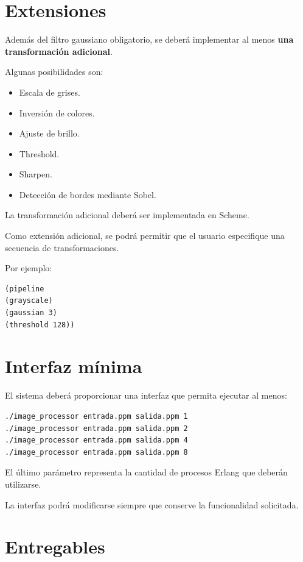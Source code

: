 \documentclass[11pt,a4paper]{article}
\begin{document}
\section{Extensiones}

Además del filtro gaussiano obligatorio, se deberá implementar al menos
\textbf{una transformación adicional}.

Algunas posibilidades son:

\begin{itemize}
\item Escala de grises.
\item Inversión de colores.
\item Ajuste de brillo.
\item Threshold.
\item Sharpen.
\item Detección de bordes mediante Sobel.
\end{itemize}

La transformación adicional deberá ser implementada en Scheme.

Como extensión adicional, se podrá permitir que el usuario especifique
una secuencia de transformaciones.

Por ejemplo:

\begin{lstlisting}
(pipeline
(grayscale)
(gaussian 3)
(threshold 128))
\end{lstlisting}

\section{Interfaz mínima}

El sistema deberá proporcionar una interfaz que permita ejecutar al
menos:

\begin{lstlisting}
./image_processor entrada.ppm salida.ppm 1
./image_processor entrada.ppm salida.ppm 2
./image_processor entrada.ppm salida.ppm 4
./image_processor entrada.ppm salida.ppm 8
\end{lstlisting}

El último parámetro representa la cantidad de procesos Erlang que
deberán utilizarse.

La interfaz podrá modificarse siempre que conserve la funcionalidad
solicitada.

\section{Entregables}
\end{document}
